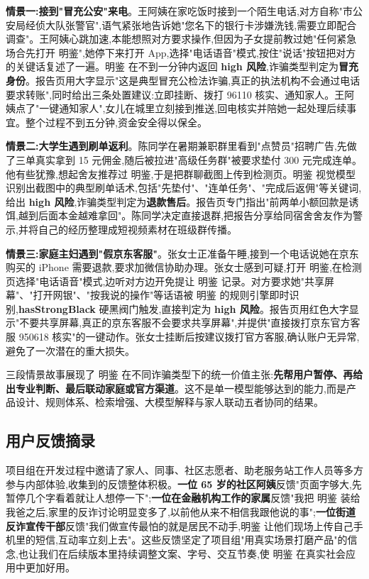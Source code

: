 \documentclass[UTF8,a4paper,12pt]{ctexart}
\begin{document}
\textbf{情景一:接到"冒充公安"来电}。王阿姨在家吃饭时接到一个陌生电话,对方自称"市公安局经侦大队张警官",语气紧张地告诉她"您名下的银行卡涉嫌洗钱,需要立即配合调查"。王阿姨心跳加速,本能想照对方要求操作,但因为子女提前教过她"任何紧急场合先打开 明鉴",她停下来打开 App,选择"电话语音"模式,按住"说话"按钮把对方的关键话复述了一遍。明鉴 在不到一分钟内返回 \textbf{high 风险},诈骗类型判定为\textbf{冒充身份}。报告页用大字显示"这是典型冒充公检法诈骗,真正的执法机构不会通过电话要求转账",同时给出三条处置建议:立即挂断、拨打 96110 核实、通知家人。王阿姨点了"一键通知家人",女儿在城里立刻接到推送,回电核实并陪她一起处理后续事宜。整个过程不到五分钟,资金安全得以保全。

\textbf{情景二:大学生遇到刷单返利}。陈同学在暑期兼职群里看到"点赞员"招聘广告,先做了三单真实拿到 15 元佣金,随后被拉进"高级任务群"被要求垫付 300 元完成连单。他有些犹豫,想起舍友推荐过 明鉴,于是把群聊截图上传到检测页。明鉴 视觉模型识别出截图中的典型刷单话术,包括"先垫付"、"连单任务"、"完成后返佣"等关键词,给出 \textbf{high 风险},诈骗类型判定为\textbf{退款售后}。报告页专门指出"前两单小额回款是诱饵,越到后面本金越难拿回"。陈同学决定直接退群,把报告分享给同宿舍舍友作为警示,并将自己的经历整理成短视频素材在班级群传播。

\textbf{情景三:家庭主妇遇到"假京东客服"}。张女士正准备午睡,接到一个电话说她在京东购买的 iPhone 需要退款,要求加微信协助办理。张女士感到可疑,打开 明鉴,在检测页选择"电话语音"模式,边听对方边开免提让 明鉴 记录。对方要求她"共享屏幕"、"打开网银"、"按我说的操作"等话语被 明鉴 的规则引擎即时识别,\textbf{hasStrongBlack} 硬黑阀门触发,直接判定为 \textbf{high 风险}。报告页用红色大字显示"不要共享屏幕,真正的京东客服不会要求共享屏幕",并提供"直接拨打京东官方客服 950618 核实"的一键动作。张女士挂断后按建议拨打官方客服,确认账户无异常,避免了一次潜在的重大损失。

三段情景故事展现了 明鉴 在不同诈骗类型下的统一价值主张:\textbf{先帮用户暂停、再给出专业判断、最后联动家庭或官方渠道}。这不是单一模型能够达到的能力,而是产品设计、规则体系、检索增强、大模型解释与家人联动五者协同的结果。

\subsection{用户反馈摘录}

项目组在开发过程中邀请了家人、同事、社区志愿者、助老服务站工作人员等多方参与内部体验,收集到的反馈整体积极。\textbf{一位 65 岁的社区阿姨}反馈"页面字够大,先暂停几个字看着就让人想停一下";\textbf{一位在金融机构工作的家属}反馈"我把 明鉴 装给我爸之后,家里的反诈讨论明显变多了,以前他从来不相信我跟他说的事";\textbf{一位街道反诈宣传干部}反馈"我们做宣传最怕的就是居民不动手,明鉴 让他们现场上传自己手机里的短信,互动率立刻上去"。这些反馈坚定了项目组"用真实场景打磨产品"的信念,也让我们在后续版本里持续调整文案、字号、交互节奏,使 明鉴 在真实社会应用中更加好用。
\end{document}
